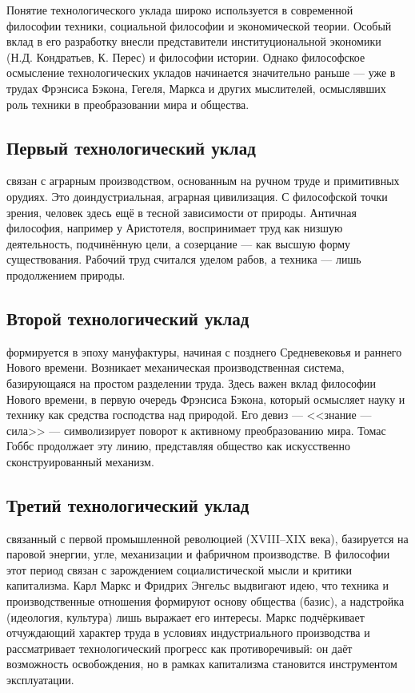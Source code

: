 \documentclass[12pt,a4paper]{article}
\begin{document}
	Понятие технологического уклада широко используется в современной философии техники, социальной философии и экономической теории. Особый вклад в его разработку внесли представители институциональной экономики (Н.Д. Кондратьев, К. Перес) и философии истории. Однако философское осмысление технологических укладов начинается значительно раньше — уже в трудах Фрэнсиса Бэкона, Гегеля, Маркса и других мыслителей, осмыслявших роль техники в преобразовании мира и общества.
	
	\subsection{Первый технологический уклад}
	связан с аграрным производством, основанным на ручном труде и примитивных орудиях. Это доиндустриальная, аграрная цивилизация. С философской точки зрения, человек здесь ещё в тесной зависимости от природы. Античная философия, например у Аристотеля, воспринимает труд как низшую деятельность, подчинённую цели, а созерцание — как высшую форму существования. Рабочий труд считался уделом рабов, а техника — лишь продолжением природы.
	
	\subsection{Второй технологический уклад}
	формируется в эпоху мануфактуры, начиная с позднего Средневековья и раннего Нового времени. Возникает механическая производственная система, базирующаяся на простом разделении труда. Здесь важен вклад философии Нового времени, в первую очередь Фрэнсиса Бэкона, который осмысляет науку и технику как средства господства над природой. Его девиз — <<знание — сила>> — символизирует поворот к активному преобразованию мира. Томас Гоббс продолжает эту линию, представляя общество как искусственно сконструированный механизм.
	
	\subsection{Третий технологический уклад}
	связанный с первой промышленной революцией (XVIII–XIX века), базируется на паровой энергии, угле, механизации и фабричном производстве. В философии этот период связан с зарождением социалистической мысли и критики капитализма. Карл Маркс и Фридрих Энгельс выдвигают идею, что техника и производственные отношения формируют основу общества (базис), а надстройка (идеология, культура) лишь выражает его интересы. Маркс подчёркивает отчуждающий характер труда в условиях индустриального производства и рассматривает технологический прогресс как противоречивый: он даёт возможность освобождения, но в рамках капитализма становится инструментом эксплуатации.
	
\end{document}
